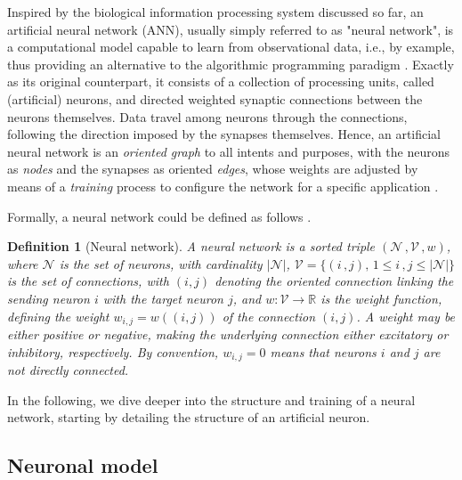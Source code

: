 \documentclass[12pt, a4paper, twoside, openright]{report}
\numberwithin{equation}{chapter}
\theoremstyle{theorem}
\theoremstyle{definition}
\newtheorem{definition}{Definition}[chapter]
\theoremstyle{remark}
\theoremstyle{proposition}
\numberwithin{figure}{chapter}
\begin{document}
		Inspired by the biological information processing system discussed so far, an artificial neural network (ANN), usually simply referred to as "neural network", is a computational model capable to learn from observational data, i.e., by example, thus providing an alternative to the algorithmic programming paradigm \cite{Nie15}. Exactly as its original counterpart, it consists of a collection of processing units, called (artificial) neurons, and directed weighted synaptic connections between the neurons themselves. Data travel among neurons through the connections, following the direction imposed by the synapses themselves. Hence, an artificial neural network is an \emph{oriented graph} to all intents and purposes, with the neurons as \emph{nodes} and the synapses as oriented \emph{edges}, whose weights are adjusted by means of a \emph{training} process to configure the network for a specific application \cite{SD13}. 
		
		Formally, a neural network could be defined as follows \cite{Kri}.
		
		\begin{definition}[Neural network]
			\label{def:neural-network}
			\emph{
			A \emph{neural network} is a sorted triple $\left( \mathcal{N} \, , \mathcal{V} \, , w \right)$, where $\mathcal{N}$ is the set of \emph{neurons}, with cardinality $|\mathcal{N}|$, $\mathcal{V} = \big\lbrace (i \, , j), \, 1 \leq i \, , j  \leq |\mathcal{N}| \big\rbrace$ is the set of \emph{connections}, with $(i,j)$ denoting the oriented connection linking the sending neuron $i$ with the target neuron $j$, and $w : \mathcal{V} \rightarrow \mathbb{R}$ is the \emph{weight function}, defining the weight $w_{i,j} = w((i,j))$ of the connection $(i,j)$. A weight may be either positive or negative, making the underlying connection either excitatory or inhibitory, respectively. By convention, $w_{i,j} = 0$ means that neurons $i$ and $j$ are not directly connected.
			}
		\end{definition}
		
		In the following, we dive deeper into the structure and training of a neural network, starting by detailing the structure of an artificial neuron.  
		
	\vspace*{0.3cm}
														
	\subsection{Neuronal model}
	\label{section:Neuronal model}
	
\end{document}
